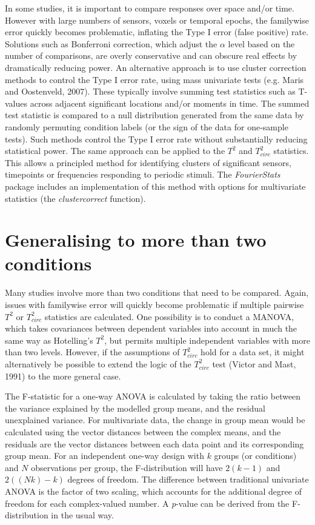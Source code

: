 \documentclass[]{article}
\begin{document}
In some studies, it is important to compare responses over space and/or time. However with large numbers of sensors, voxels or temporal epochs, the familywise error quickly becomes problematic, inflating the Type I error (false positive) rate. Solutions such as Bonferroni correction, which adjust the \(\alpha\) level based on the number of comparisons, are overly conservative and can obscure real effects by dramatically reducing power. An alternative approach is to use cluster correction methods to control the Type I error rate, using mass univariate tests (e.g. Maris and Oostenveld, 2007). These typically involve summing test statistics such as T-values across adjacent significant locations and/or moments in time. The summed test statistic is compared to a null distribution generated from the same data by randomly permuting condition labels (or the sign of the data for one-sample tests). Such methods control the Type I error rate without substantially reducing statistical power. The same approach can be applied to the \(T^2\) and \(T^2_{circ}\) statistics. This allows a principled method for identifying clusters of significant sensors, timepoints or frequencies responding to periodic stimuli. The \emph{FourierStats} package includes an implementation of this method with options for multivariate statistics (the \emph{clustercorrect} function).

\hypertarget{generalising-to-more-than-two-conditions}{%
\section{Generalising to more than two conditions}\label{generalising-to-more-than-two-conditions}}

Many studies involve more than two conditions that need to be compared. Again, issues with familywise error will quickly become problematic if multiple pairwise \(T^2\) or \(T^2_{circ}\) statistics are calculated. One possibility is to conduct a MANOVA, which takes covariances between dependent variables into account in much the same way as Hotelling's \(T^2\), but permits multiple independent variables with more than two levels. However, if the assumptions of \(T^2_{circ}\) hold for a data set, it might alternatively be possible to extend the logic of the \(T^2_{circ}\) test (Victor and Mast, 1991) to the more general case.

The F-statistic for a one-way ANOVA is calculated by taking the ratio between the variance explained by the modelled group means, and the residual unexplained variance. For multivariate data, the change in group mean would be calculated using the vector distances between the complex means, and the residuals are the vector distances between each data point and its corresponding group mean. For an independent one-way design with \(k\) groups (or conditions) and \(N\) observations per group, the F-distribution will have \(2(k-1)\) and \(2((Nk)-k)\) degrees of freedom. The difference between traditional univariate ANOVA is the factor of two scaling, which accounts for the additional degree of freedom for each complex-valued number. A \emph{p}-value can be derived from the F-distribution in the usual way.
\end{document}
